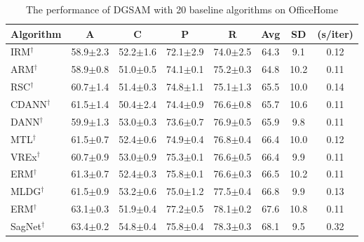 \documentclass{article}
\theoremstyle{plain}
\theoremstyle{definition}
\theoremstyle{remark}
\begin{document}
\begin{table}[!ht]
\centering
\normalsize
\caption{The performance of DGSAM with 20 baseline algorithms on OfficeHome}
\begin{tabular}{l|cccc|ccc}
\hline
Algorithm        & A    & C    & P   & R   & Avg   & SD   & (s/iter) \\ \toprule
IRM\(^\dag\) \cite{arjovsky2019irm}         & {58.9\scriptsize$\pm$2.3} & {52.2\scriptsize$\pm$1.6} & {72.1\scriptsize$\pm$2.9} & {74.0\scriptsize$\pm$2.5} & 64.3 & 9.1  & 0.12 \\
ARM\(^\dag\) \cite{zhang2021arm}         & {58.9\scriptsize$\pm$0.8} & {51.0\scriptsize$\pm$0.5} & {74.1\scriptsize$\pm$0.1} & {75.2\scriptsize$\pm$0.3} & 64.8 & 10.2 & 0.11 \\
RSC\(^\dag\) \cite{huang2020rsc}         & {60.7\scriptsize$\pm$1.4} & {51.4\scriptsize$\pm$0.3} & {74.8\scriptsize$\pm$1.1} & {75.1\scriptsize$\pm$1.3} & 65.5 & 10.0 & 0.14 \\
CDANN\(^\dag\) \cite{li2018cdann}         & {61.5\scriptsize$\pm$1.4} & {50.4\scriptsize$\pm$2.4} & {74.4\scriptsize$\pm$0.9} & {76.6\scriptsize$\pm$0.8} & 65.7 & 10.6 & 0.11 \\
DANN\(^\dag\) \cite{ganin2016dann}         & {59.9\scriptsize$\pm$1.3} & {53.0\scriptsize$\pm$0.3} & {73.6\scriptsize$\pm$0.7} & {76.9\scriptsize$\pm$0.5} & 65.9 & 9.8  & 0.11 \\
MTL\(^\dag\) \cite{blanchard2021mtl}         & {61.5\scriptsize$\pm$0.7} & {52.4\scriptsize$\pm$0.6} & {74.9\scriptsize$\pm$0.4} & {76.8\scriptsize$\pm$0.4} & 66.4 & 10.0 & 0.12 \\
VREx\(^\dag\) \cite{krueger2021vrex}         & {60.7\scriptsize$\pm$0.9} & {53.0\scriptsize$\pm$0.9} & {75.3\scriptsize$\pm$0.1} & {76.6\scriptsize$\pm$0.5} & 66.4 & 9.9  & 0.11 \\
ERM\(^\dag\)         & {61.3\scriptsize$\pm$0.7} & {52.4\scriptsize$\pm$0.3} & {75.8\scriptsize$\pm$0.1} & {76.6\scriptsize$\pm$0.3} & 66.5 & 10.2 & 0.11 \\
MLDG\(^\dag\) \cite{li2018mldg}         & {61.5\scriptsize$\pm$0.9} & {53.2\scriptsize$\pm$0.6} & {75.0\scriptsize$\pm$1.2} & {77.5\scriptsize$\pm$0.4} & 66.8 & 9.9  & 0.13 \\
ERM\(^\dag\)         & {63.1\scriptsize$\pm$0.3} & {51.9\scriptsize$\pm$0.4} & {77.2\scriptsize$\pm$0.5} & {78.1\scriptsize$\pm$0.2} & 67.6 & 10.8 & 0.11 \\
SagNet\(^\dag\) \cite{nam2021sagnet}         & {63.4\scriptsize$\pm$0.2} & {54.8\scriptsize$\pm$0.4} & {75.8\scriptsize$\pm$0.4} & {78.3\scriptsize$\pm$0.3} & 68.1 & 9.5  & 0.32 \\

\end{tabular}
\end{table}
\end{document}
